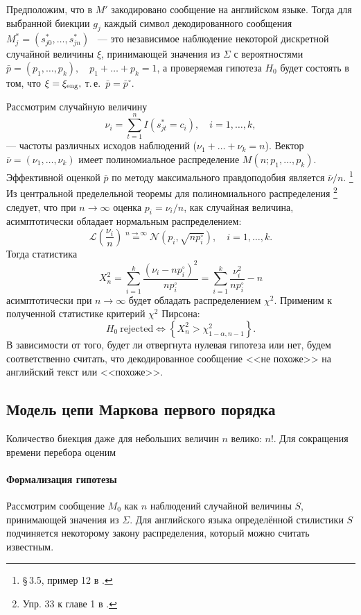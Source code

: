 \documentclass[a4paper,10pt]{article}
\begin{document}
Предположим, что в $M'$ закодировано сообщение на английском языке.
Тогда для выбранной биекции $g_j$ каждый символ декодированного сообщения 
$M_j^{*} = (s_{j0}^{*}, \ldots, s_{jn}^{*})$%
~--- это независимое наблюдение некоторой дискретной случайной 
величины $\xi$, принимающей значения из $\Sigma$
с вероятностями $\bar{p} = (p_1, \ldots, p_k), \quad p_1 + \ldots + p_k = 1$,
а проверяемая гипотеза $H_0$ будет состоять в том, что $\xi = \xi_{\rm eng},$
т.\,е.~$\bar{p} = \bar{p}^{\circ}.$

Рассмотрим случайную величину
$$\nu_i = \sum\limits_{t=1}^{n} I(s_{jt}^{*} = c_i), \quad i=1,\ldots,k,$$
--- частоты различных исходов наблюдений ($\nu_1+\ldots+\nu_k=n$).
Вектор $\bar{\nu} = (\nu_1, \ldots, \nu_k)$ 
имеет полиномиальное распределение $M(n; p_1, \ldots, p_k).$
Эффективной оценкой $\bar{p}$ по методу
максимального правдоподобия является $\bar{\nu} / n$.%
\footnote{\S\,3.5, пример 12 в \cite{ivchmed2010matstat}.}
Из центральной пределельной теоремы для полиномиального распределения%
\footnote{Упр. 33 к главе 1 в \cite{ivchmed2010matstat}.}
следует, что при $n \rightarrow \infty$ оценка 
$p_i = \nu_i / n$, как случайная величина,
асимптотически обладает нормальным распределением:
$$\mathcal{L}\left(\frac{\nu_i}{n}\right) 
    \stackrel{n \rightarrow \infty}{=} \mathcal{N}(p_i, \sqrt{np_i^\circ}), \quad i=1,\ldots,k.$$
Тогда статистика
$$X_n^2 = \sum\limits_{i=1}^{k} \frac{(\nu_i - np_i^\circ)^2}{np_i^\circ} = 
  \sum\limits_{i=1}^{k} \frac{\nu_i^2}{np_i^\circ} - n$$
асимптотически при $n \rightarrow \infty$ будет обладать распределением $\chi^2.$
Применим к полученной статистике критерий $\chi^2$ Пирсона:
$$H_0\ \mathrm{rejected} \Leftrightarrow 
    \left \{ X_n^2 > \chi_{1-\alpha,n-1}^2 \right \}.$$
В зависимости от того, будет ли отвергнута нулевая гипотеза или нет, будем 
соответственно считать, что декодированное сообщение <<не похоже>> на английский
текст или <<похоже>>.

\subsection{Модель цепи Маркова первого порядка}

Количество биекция даже для небольших величин $n$ велико: $n!$.
Для сокращения времени перебора оценим 

\paragraph{Формализация гипотезы}
Рассмотрим сообщение $M_0$ как $n$ наблюдений случайной величины $S$, 
принимающей значения из $\Sigma$.
Для английского языка определённой стилистики $S$ подчиняется некоторому
закону распределения, который можно считать известным.
\end{document}
